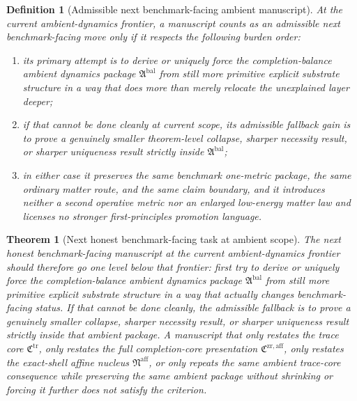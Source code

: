 \documentclass[11pt]{article}
\newcommand{\CompletionCore}{\mathfrak C^{\mathrm{zr,aff}}}
\newcommand{\TraceCore}{\mathfrak C^{\mathrm{tr}}}
\newcommand{\AffineNucleus}{\mathfrak N^{\mathrm{aff}}}
\newcommand{\AmbientPackage}{\mathfrak A^{\mathrm{bal}}}
\newtheorem{definition}{Definition}
\newtheorem{theorem}{Theorem}
\begin{document}
\begin{definition}[Admissible next benchmark-facing ambient manuscript]
At the current ambient-dynamics frontier, a manuscript counts as an admissible next benchmark-facing move only if it respects the following burden order:
\begin{enumerate}
    \item its primary attempt is to derive or uniquely force the completion-balance ambient dynamics package \(\AmbientPackage\) from still more primitive explicit substrate structure in a way that does more than merely relocate the unexplained layer deeper;
    \item if that cannot be done cleanly at current scope, its admissible fallback gain is to prove a genuinely smaller theorem-level collapse, sharper necessity result, or sharper uniqueness result strictly inside \(\AmbientPackage\);
    \item in either case it preserves the same benchmark one-metric package, the same ordinary matter route, and the same claim boundary, and it introduces neither a second operative metric nor an enlarged low-energy matter law and licenses no stronger first-principles promotion language.
\end{enumerate}
\end{definition}

\begin{theorem}[Next honest benchmark-facing task at ambient scope]
The next honest benchmark-facing manuscript at the current ambient-dynamics frontier should therefore go one level below that frontier: first try to derive or uniquely force the completion-balance ambient dynamics package \(\AmbientPackage\) from still more primitive explicit substrate structure in a way that actually changes benchmark-facing status. If that cannot be done cleanly, the admissible fallback is to prove a genuinely smaller collapse, sharper necessity result, or sharper uniqueness result strictly inside that ambient package. A manuscript that only restates the trace core \(\TraceCore\), only restates the full completion-core presentation \(\CompletionCore\), only restates the exact-shell affine nucleus \(\AffineNucleus\), or only repeats the same ambient trace-core consequence while preserving the same ambient package without shrinking or forcing it further does not satisfy the criterion.
\end{theorem}
\end{document}
